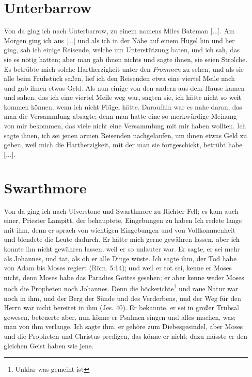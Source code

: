 \section{Unterbarrow}

Von da ging ich nach Unterbarrow, zu einem namens Miles
Bateman [...]. Am Morgen ging ich 
aus [...] und als ich in
der Nähe auf einem Hügel hin und her ging, sah ich einige
Reisende, welche um Unterstützung baten, und ich sah, das sie
es nötig hatten; aber man gab ihnen nichts und sagte ihnen, sie
seien Strolche. Es betrübte mich solche Hartherzigkeit unter den
\textit{Frommen} zu sehen, und als sie alle beim Frühstück saßen, lief
ich den Reisenden etwa eine viertel Meile nach und gab ihnen
etwas Geld. Als nun einige von den andern 
aus dem Hause
kamen und sahen, das ich eine viertel Meile weg war, sagten sie, ich
hätte nicht so weit kommen können, wenn ich nicht Flügel hätte.
Daraufhin war es nahe daran, das man die Versammlung 
absagte; denn man hatte eine so merkwürdige Meinung von mir
bekommen, das viele nicht eine Versammlung mit mir haben
wollten. Ich 
sagte ihnen, ich sei jenen armen Reisenden  
nachgelaufen, um ihnen etwas Geld zu geben, weil mich die 
Hartherzigkeit, mit der man sie fortgeschickt, betrübt habe [...].

\section{Swarthmore}

Von da ging ich nach Ulverstone 
und Swarthmore zu
Richter Fell; es kam auch einer, 
Priester Lampitt, der behauptete,
Eingebungen zu haben Ich redete 
lange mit ihm, denn er sprach
von wichtigen Eingebungen und von 
Vollkommenheit und 
blendete die Leute dadurch. Er hätte mich gerne gewähren lassen,
aber ich konnte ihn nicht gewähren lassen, weil er so unlauter
war. Er sagte, er sei mehr als Johannes, und tat, als ob er
alle Dinge wüste. Ich sagte ihm, der Tod habe von Adam bis
Moses regiert (Röm. 5:14); 
und weil er tot sei, kenne er Moses
nicht, denn Moses habe das Paradies Gottes gesehen; er aber
kenne weder Moses noch die Propheten noch Johannes. Denn
die höckerichte\footnote{Unklar was gemeint ist} 
und raue Natur war noch in ihm, und der Berg
der Sünde und des Verderbens, und der Weg für den Herrn
war nicht bereitet in ihm (Jes. 40). 
Er bekannte, er sei in großer
Trübsal gewesen, beteuerte aber, nun könne er Psalmen singen
und alles machen, was; man von ihm verlange. Ich sagte ihm,
er gehöre zum Diebesgesindel, aber Moses und die Propheten
und Christus predigen, das könne er nicht; dazu müsste er den
gleichen Geist haben wie jene. 

